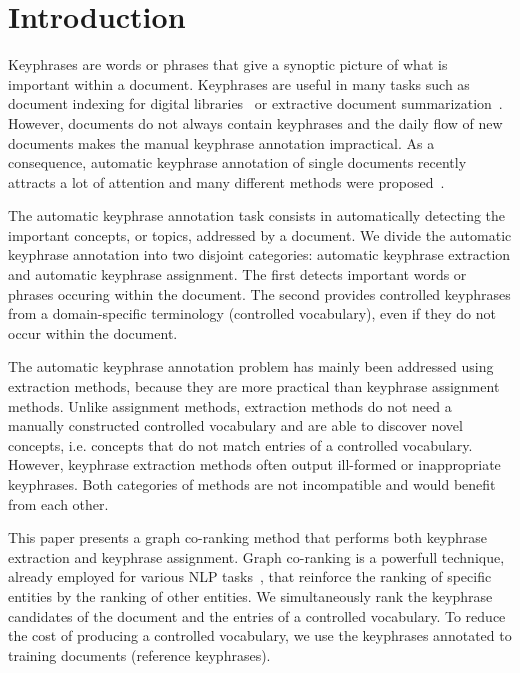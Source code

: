\section{Introduction}
\label{sec: introduction}
  Keyphrases are words or phrases that give a synoptic picture of what is
  important within a document. Keyphrases are useful in many tasks such as
  document indexing for digital
  libraries~\cite{gutwin1999keyphrasesfordigitallibraries} or extractive
  document summarization~\cite{litvak2008graphbased}. However, documents do not
  always contain keyphrases and the daily flow of new documents makes the manual
  keyphrase annotation impractical. As a consequence, automatic keyphrase
  annotation of single documents recently attracts a lot of attention and many
  different methods were proposed~\cite{hasan2014state_of_the_art}.

  The automatic keyphrase annotation task consists in automatically detecting
  the important concepts, or topics, addressed by a document. We divide the
  automatic keyphrase annotation into two disjoint categories: automatic
  keyphrase extraction and automatic keyphrase assignment. The first detects
  important words or phrases occuring within the document. The second provides
  controlled keyphrases from a domain-specific terminology (controlled
  vocabulary), even if they do not occur within the document.

  The automatic keyphrase annotation problem has mainly been addressed using
  extraction methods, because they are more practical than keyphrase assignment
  methods. Unlike assignment methods, extraction methods do not need a manually
  constructed controlled vocabulary and are able to discover novel concepts,
  i.e. concepts that do not match entries of a controlled vocabulary. However,
  keyphrase extraction methods often output ill-formed or inappropriate
  keyphrases. Both categories of methods are not incompatible and would benefit
  from each other.

  This paper presents a graph co-ranking method that performs both keyphrase
  extraction and keyphrase assignment. Graph co-ranking is a powerfull
  technique, already employed for various NLP tasks~\cite{}, that reinforce the
  ranking of specific entities by the ranking of other entities. We
  simultaneously rank the keyphrase candidates of the document and the entries
  of a controlled vocabulary. To reduce the cost of producing a controlled
  vocabulary, we use the keyphrases annotated to training documents (reference
  keyphrases).

